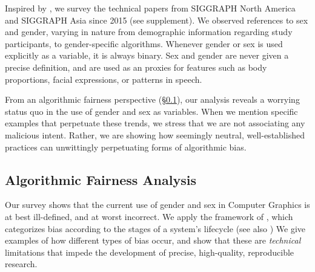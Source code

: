 \documentclass[nonacm,sigconf,review,balance=false]{acmart}
\begin{document}
Inspired by \citet{keyes2018misgendering}, we survey
the technical papers from SIGGRAPH North America and SIGGRAPH Asia since
2015 (see supplement). We observed references to sex and gender, varying in nature from demographic information regarding study participants, to gender-specific algorithms. Whenever gender or sex is used
explicitly as a variable, it is always binary. Sex and gender are never given a precise definition, and are used as an proxies for features such as body proportions, facial expressions, or patterns in speech.

From an algorithmic fairness perspective (\S\ref{sec:analysis}), our analysis reveals a worrying status quo in the use of gender and sex
as variables. When we
mention specific examples that perpetuate these trends, we stress that we are not
associating any malicious intent. Rather, we are showing how seemingly
neutral, well-established practices can unwittingly
perpetuating forms of algorithmic bias.

\vspace{-0.1cm}
\subsection{Algorithmic Fairness Analysis}\label{sec:analysis}

Our survey shows that the current use of gender and sex in Computer Graphics is at best ill-defined, and at worst incorrect.
We apply the framework of \citet{Suresh2021}, which categorizes bias according to the stages of a system's lifecycle 
(see also \cite{fairnesssurvey,FriedmanAndNissenbaum,olteanu2019social})
We give examples of how different types of bias occur, and show that these are \emph{technical} limitations that impede the development of precise, high-quality, reproducible research.
\end{document}
